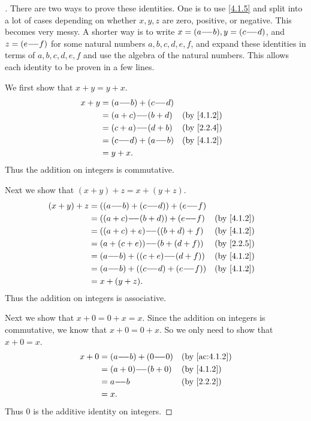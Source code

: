 \begin{proof}[]
  There are two ways to prove these identities.
  One is to use \cref{4.1.5} and split into a lot of cases depending on whether \(x, y, z\) are zero, positive, or negative.
  This becomes very messy.
  A shorter way is to write \(x = (a {-}\!{-} b), y = (c {-}\!{-} d)\), and \(z = (e {-}\!{-} f)\) for some natural numbers \(a, b, c, d, e, f\), and expand these identities in terms of \(a, b, c, d, e, f\) and use the algebra of the natural numbers.
  This allows each identity to be proven in a few lines.

  We first show that \(x + y = y + x\).
  \begin{align*}
    x + y & = (a \mm b) + (c \mm d) &                \\
          & = (a + c) \mm (b + d)   &   & \by{4.1.2} \\
          & = (c + a) \mm (d + b)   &   & \by{2.2.4} \\
          & = (c \mm d) + (a \mm b) &   & \by{4.1.2} \\
          & = y + x.
  \end{align*}
  Thus the addition on integers is commutative.

  Next we show that \((x + y) + z = x + (y + z)\).
  \begin{align*}
    (x + y) + z & = ((a \mm b) + (c \mm d)) + (e \mm f)                 \\
                & = ((a + c) \mm (b + d)) + (e \mm f)   &  & \by{4.1.2} \\
                & = ((a + c) + e) \mm ((b + d) + f)     &  & \by{4.1.2} \\
                & = (a + (c + e)) \mm (b + (d + f))     &  & \by{2.2.5} \\
                & = (a \mm b) + ((c + e) \mm (d + f))   &  & \by{4.1.2} \\
                & = (a \mm b) + ((c \mm d) + (e \mm f)) &  & \by{4.1.2} \\
                & = x + (y + z).
  \end{align*}
  Thus the addition on integers is associative.

  Next we show that \(x + 0 = 0 + x = x\).
  Since the addition on integers is commutative, we know that \(x + 0 = 0 + x\).
  So we only need to show that \(x + 0 = x\).
  \begin{align*}
    x + 0 & = (a \mm b) + (0 \mm 0) &  & \by{ac:4.1.2} \\
          & = (a + 0) \mm (b + 0)   &  & \by{4.1.2}    \\
          & = a \mm b               &  & \by{2.2.2}    \\
          & = x.
  \end{align*}
  Thus \(0\) is the additive identity on integers.


\end{proof}
